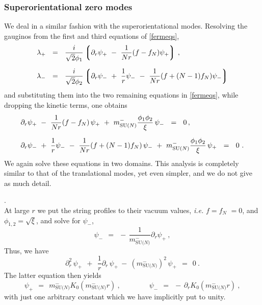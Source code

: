\documentclass[12pt]{article}
\def\beq{\begin{equation}}
\def\eeq{\end{equation}}
\newcommand{\p}{\partial}
\newcommand{\lgr}{\left\lgroup}
\newcommand{\rgr}{\right\rgroup}
\newcommand{\mNm}{m_\text{SU($N$)}^{-}}
\begin{document}
\subsubsection{Superorientational zero modes}
	We deal in a similar fashion with the superorientational modes.
	Resolving the gauginos from the first and  third equations of \eqref{fermeqs},
\begin{align}
%
\notag
	\lambda_+ & ~~=~~ \frac{i}{\sqrt{2}\phi_1} \lgr \p_r \psi_+ ~-~ \frac{1}{Nr}(f - f_N)\psi_+ \rgr  \,,\\[2mm]
%
\notag
	\lambda_- & ~~=~~ \frac{i}{\sqrt{2}\phi_2} \lgr \p_r \psi_- ~+~ \frac{1}{r} \psi_- ~-~ \frac{1}{Nr}(f + (N-1)f_N)\psi_- \rgr
\end{align}
	and substituting them into the two remaining equations in \eqref{fermeqs}, while dropping 
	the kinetic terms, one obtains
\begin{align}
%
\notag
	& \p_r \psi_+ ~-~ \frac{1}{Nr} (f - f_N)\, \psi_+ ~+~ \mNm \frac{\phi_1\phi_2}{\xi}\, \psi_- ~~=~~ 0 \,,\\[2mm]
%
\label{orient_large_mu}
	& \p_r \psi_- ~+~ \frac{1}{r}\psi_- ~-~ \frac{1}{Nr}(f + (N-1)f_N)\, \psi_- ~+~ \mNm \frac{\phi_1\phi_2}{\xi}\, \psi_+ ~~=~~ 0~.
\end{align}
	We again solve these equations in two domains.
	This analysis is completely similar to that of the translational modes, yet even simpler,
	and we do not give as much detail.

	{.}\\[2mm]
	At large $ r $ we put the string profiles to their vacuum values, {\it i.e.} $ f = f_N $ $ = 0 $,
	and $ \phi_{1,2} = \sqrt{\xi} $, and solve for $ \psi_- $,
\[
	\psi_- ~~=~~ -\,\frac{1}{\mNm} \p_r \psi_+~,
\]
	Thus, we  have
\[	
	\p_r^2\, \psi_+  ~~+~~ \frac{1}{r}\p_r\, \psi_+ ~-~ (\mNm)^2\, \psi_+ ~~=~~ 0~.
\]
	The latter equation then yields 
\beq
\label{sorient_K}
	\psi_+ ~~=~~ \mNm K_0(\mNm r)~, \qquad\qquad \psi_- ~~=~~ -\, \p_r K_0(\mNm r)~,
\eeq
	with just one arbitrary constant which we have implicitly put to unity.
\end{document}
